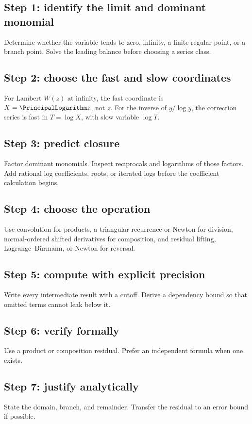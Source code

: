 \documentclass[11pt,openany]{book}
\theoremstyle{definition}
\theoremstyle{plain}
\theoremstyle{remark}
\begin{document}
\subsection*{Step 1: identify the limit and dominant monomial}
Determine whether the variable tends to zero, infinity, a finite regular point,
or a branch point.  Solve the leading balance before choosing a series class.

\subsection*{Step 2: choose the fast and slow coordinates}
For Lambert \(W(z)\) at infinity, the fast coordinate is \(X=\PrincipalLogarithm z\), not
\(z\).  For the inverse of \(y/\log y\), the correction series is fast in
\(T=\log X\), with slow variable \(\log T\).

\subsection*{Step 3: predict closure}
Factor dominant monomials.  Inspect reciprocals and logarithms of those
factors.  Add rational log coefficients, roots, or iterated logs before the
coefficient calculation begins.

\subsection*{Step 4: choose the operation}
Use convolution for products, a triangular recurrence or Newton for division,
normal-ordered shifted derivatives for composition, and residual lifting,
Lagrange--Bürmann, or Newton for reversal.

\subsection*{Step 5: compute with explicit precision}
Write every intermediate result with a cutoff.  Derive a dependency bound so
that omitted terms cannot leak below it.

\subsection*{Step 6: verify formally}
Use a product or composition residual.  Prefer an independent formula when one
exists.

\subsection*{Step 7: justify analytically}
State the domain, branch, and remainder.  Transfer the residual to an error
bound if possible.
\end{document}

